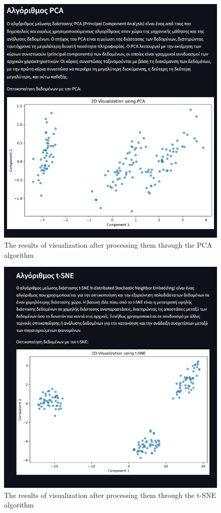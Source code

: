 \documentclass[unnumsec,webpdf,contemporary,large]{oup-authoring-template}%
\theoremstyle{thmstyleone}%
\theoremstyle{thmstyletwo}%
\theoremstyle{thmstylethree}%
\begin{document}
\begin{figure}
    \centering
    \includegraphics[width=0.9\linewidth]{pca.png}
    \caption{The results of visualization after processing them through the PCA algorithm}
    \label{fig:pca}
\end{figure}

\begin{figure}
    \centering
    \includegraphics[width=1\linewidth]{t-sne.png}
    \caption{The results of visualization after processing them through the t-SNE algorithm}
    \label{fig:t-sne}
\end{figure}
\end{document}
